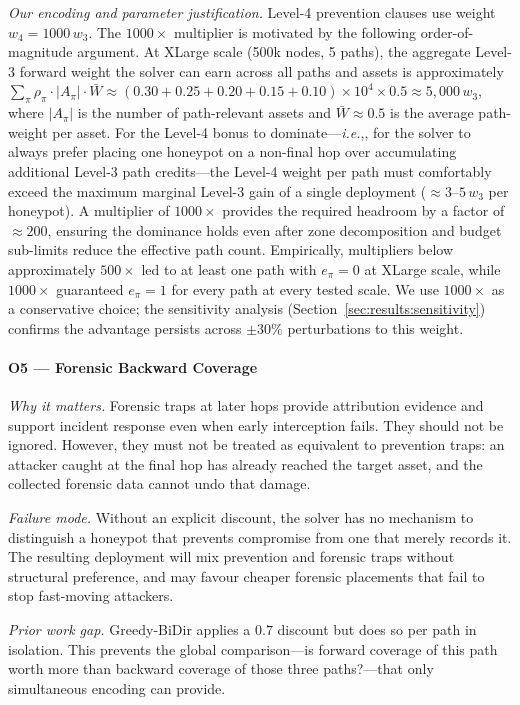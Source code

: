 \documentclass[journal]{IEEEtran}
\newcommand{\ie}{\emph{i.e.},}
\begin{document}
\textit{Our encoding and parameter justification.}
Level-4 prevention clauses use weight $w_4=1000\,w_3$. The
$1000\times$ multiplier is motivated by the following order-of-magnitude
argument. At XLarge scale (500k nodes, 5 paths), the aggregate Level-3
forward weight the solver can earn across all paths and assets is
approximately $\sum_\pi \rho_\pi \cdot |A_\pi| \cdot \bar{W} \approx
(0.30{+}0.25{+}0.20{+}0.15{+}0.10) \times 10^4 \times 0.5 \approx
5{,}000\,w_3$, where $|A_\pi|$ is the number of path-relevant assets
and $\bar{W}\approx0.5$ is the average path-weight per asset. For the
Level-4 bonus to dominate---\ie, for the solver to always prefer
placing one honeypot on a non-final hop over accumulating additional
Level-3 path credits---the Level-4 weight per path must comfortably
exceed the maximum marginal Level-3 gain of a single deployment
(${\approx}3$--$5\,w_3$ per honeypot). A multiplier of $1000\times$
provides the required headroom by a factor of ${\approx}200$, ensuring
the dominance holds even after zone decomposition and budget
sub-limits reduce the effective path count. Empirically, multipliers
below approximately $500\times$ led to at least one path with
$e_\pi=0$ at XLarge scale, while $1000\times$ guaranteed $e_\pi=1$
for every path at every tested scale. We use $1000\times$ as a
conservative choice; the sensitivity analysis
(Section~\ref{sec:results:sensitivity}) confirms the advantage
persists across $\pm30\%$ perturbations to this weight.

\paragraph{O5 --- Forensic Backward Coverage}
\textit{Why it matters.}
Forensic traps at later hops provide attribution evidence and
support incident response even when early interception fails. They
should not be ignored. However, they must not be treated as
equivalent to prevention traps: an attacker caught at the final hop
has already reached the target asset, and the collected forensic
data cannot undo that damage.

\textit{Failure mode.}
Without an explicit discount, the solver has no mechanism to
distinguish a honeypot that prevents compromise from one that merely
records it. The resulting deployment will mix prevention and forensic
traps without structural preference, and may favour cheaper forensic
placements that fail to stop fast-moving attackers.

\textit{Prior work gap.}
Greedy-BiDir applies a $0.7$ discount but does so per path in
isolation. This prevents the global comparison---is forward coverage
of this path worth more than backward coverage of those three
paths?---that only simultaneous encoding can provide.
\end{document}
